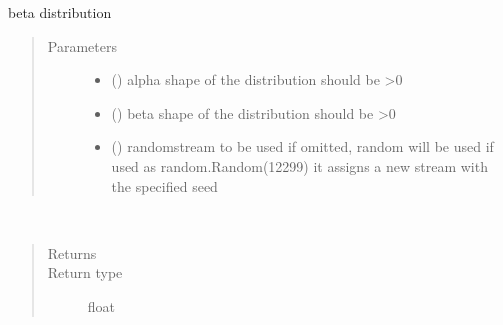 \documentclass[letterpaper,10pt,english]{sphinxmanual}
\begin{document}

\begin{fulllineitems}
\label{\detokenize{Reference:salabim.Beta}}
beta distribution
\begin{quote}\begin{description}
\item[{Parameters}] \leavevmode\begin{itemize}
\item {} 
 () \textendash{} alpha shape of the distribution 
should be \textgreater{}0

\item {} 
 () \textendash{} beta shape of the distribution 
should be \textgreater{}0

\item {} 
 () \textendash{} randomstream to be used 
if omitted, random will be used 
if used as random.Random(12299)
it assigns a new stream with the specified seed

\end{itemize}

\end{description}\end{quote}

\begin{fulllineitems}
\label{\detokenize{Reference:salabim.Beta.mean}}~\begin{quote}\begin{description}
\item[{Returns}] \leavevmode
{}

\item[{Return type}] \leavevmode
float

\end{description}\end{quote}

\end{fulllineitems}



\end{fulllineitems}
\end{document}
